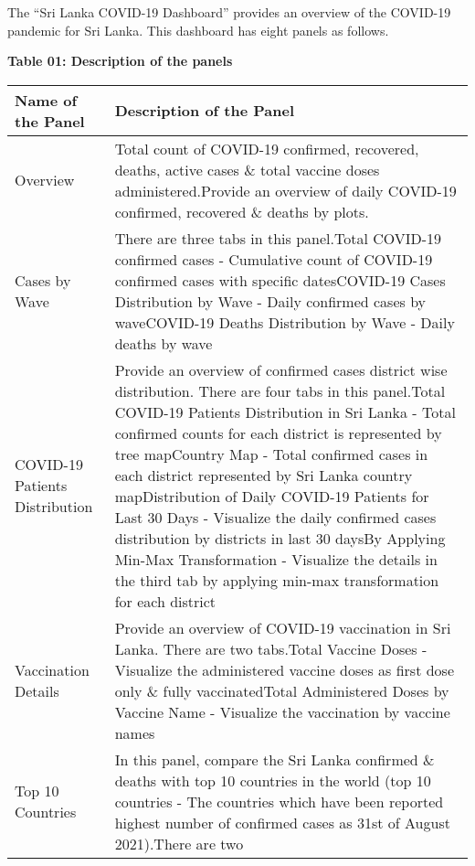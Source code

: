 \documentclass[
]{article}
\begin{document}
The ``Sri Lanka COVID-19 Dashboard'' provides an overview of the
COVID-19 pandemic for Sri Lanka. This dashboard has eight panels as
follows.

\textbf{Table 01: Description of the panels}

\begin{longtable}[]{@{}
  >{\raggedright\arraybackslash}p{}
  >{\raggedright\arraybackslash}p{}@{}}
\toprule
\textbf{Name of the Panel} & \textbf{Description of the Panel} \\
\midrule
\endhead
Overview & Total count of COVID-19 confirmed, recovered, deaths, active
cases \& total vaccine doses administered.\hfill\break Provide an
overview of daily COVID-19 confirmed, recovered \& deaths by
plots.\hfill\break \\
Cases by Wave & There are three tabs in this panel.\hfill\break  * Total
COVID-19 confirmed cases - Cumulative count of COVID-19 confirmed cases
with specific dates\hfill\break * COVID-19 Cases Distribution by Wave -
Daily confirmed cases by wave\hfill\break * COVID-19 Deaths Distribution
by Wave - Daily deaths by wave\hfill\break \\
COVID-19 Patients Distribution & Provide an overview of confirmed cases
district wise distribution. There are four tabs in this
panel.\hfill\break * Total COVID-19 Patients Distribution in Sri Lanka -
Total confirmed counts for each district is represented by tree
map\hfill\break * Country Map - Total confirmed cases in each district
represented by Sri Lanka country map\hfill\break * Distribution of Daily
COVID-19 Patients for Last 30 Days - Visualize the daily confirmed cases
distribution by districts in last 30 days\hfill\break * By Applying
Min-Max Transformation - Visualize the details in the third tab by
applying min-max transformation for each district\hfill\break \\
Vaccination Details & Provide an overview of COVID-19 vaccination in Sri
Lanka. There are two tabs.\hfill\break * Total Vaccine Doses - Visualize
the administered vaccine doses as first dose only \& fully
vaccinated\hfill\break * Total Administered Doses by Vaccine Name -
Visualize the vaccination by vaccine names\hfill\break \\
Top 10 Countries & In this panel, compare the Sri Lanka confirmed \&
deaths with top 10 countries in the world (top 10 countries - The
countries which have been reported highest number of confirmed cases as
31st of August 2021).\hfill\break There are two

\end{longtable}
\end{document}
